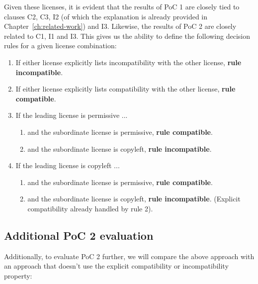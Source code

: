Given these licenses, it is evident that the results of PoC 1 are closely tied to clauses C2, C3, I2 (of which the explanation is already provided in Chapter~\ref{ch:related-work}) and I3. Likewise, the results of PoC 2 are closely related to C1, I1 and I3. This gives us the ability to define the following decision rules for a given license combination:

\begin{enumerate}
	\item If either license explicitly lists incompatibility with the other license, \textbf{rule incompatible}.
	\item If either license explicitly lists compatibility with the other license, \textbf{rule compatible}.
	\item If the leading license is permissive ...
	\begin{enumerate}
		\item and the subordinate license is permissive, \textbf{rule compatible}.
		\item and the subordinate license is copyleft, \textbf{rule incompatible}.
	\end{enumerate}
	\item If the leading license is copyleft ...
	\begin{enumerate}
		\item and the subordinate license is permissive, \textbf{rule compatible}.
		\item and the subordinate license is copyleft, \textbf{rule incompatible}. (Explicit compatibility already handled by rule 2).
	\end{enumerate}
\end{enumerate}


\subsection{Additional PoC 2 evaluation}

Additionally, to evaluate PoC 2 further, we will compare the above approach with an approach that doesn't use the explicit compatibility or incompatibility property:

